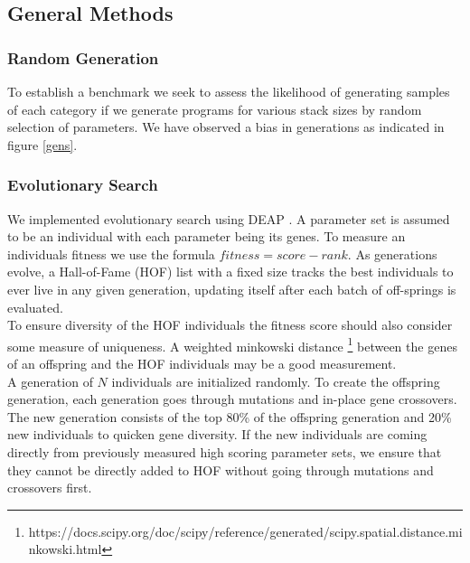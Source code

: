\documentclass{nime-alternate} %
\begin{document}
\subsection{General Methods}
\subsubsection{Random Generation}
To establish a benchmark we seek to assess the likelihood of generating samples of each category if we generate programs for various stack sizes by random selection of parameters. We have observed a bias in generations as indicated in figure \ref{gens}.\\
\subsubsection{Evolutionary Search}
We implemented evolutionary search using DEAP \citep{DEAP_JMLR2012}. A parameter set is assumed to be an individual with each parameter being its genes. To measure an individuals fitness we use the formula $fitness=score-rank$. As generations evolve, a Hall-of-Fame (HOF) list with a fixed size tracks the best individuals to ever live in any given generation, updating itself after each batch of off-springs is evaluated.\\
To ensure diversity of the HOF individuals the fitness score should also consider some measure of uniqueness. A weighted minkowski distance \footnote{https://docs.scipy.org/doc/scipy/reference/generated/scipy.spatial.distance.minkowski.html} between the genes of an offspring and the HOF individuals may be a good measurement.\\
A generation of $N$ individuals are initialized randomly. To create the offspring generation, each generation goes through mutations and in-place gene crossovers. The new generation consists of the top 80\% of the offspring generation and 20\% new individuals to quicken gene diversity. If the new individuals are coming directly from previously measured high scoring parameter sets, we ensure that they cannot be directly added to HOF without going through mutations and crossovers first.\\
\end{document}
